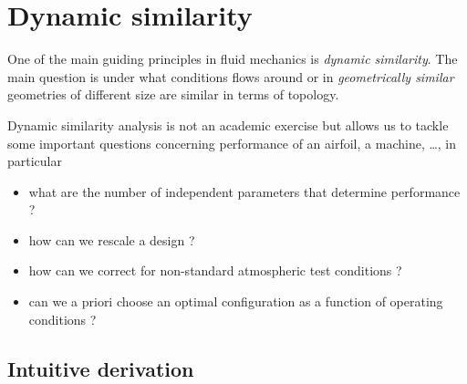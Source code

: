 \section{Dynamic similarity}


One of the main guiding principles in fluid mechanics is \emph{dynamic
  similarity}. The main question is under what conditions flows around
or in \emph{geometrically similar} geometries of different size are
similar in terms of topology.

Dynamic similarity analysis is not an academic exercise but allows us
to tackle some important questions concerning performance of an
airfoil, a machine, \ldots, in particular
\begin{itemize}
\item what are the number of independent parameters that determine
  performance ?
\item how can we rescale a design ?
\item how can we correct for non-standard atmospheric test conditions
  ?
\item can we a priori choose an optimal configuration as a function of
  operating conditions ?
\end{itemize}

\subsection{Intuitive derivation}

